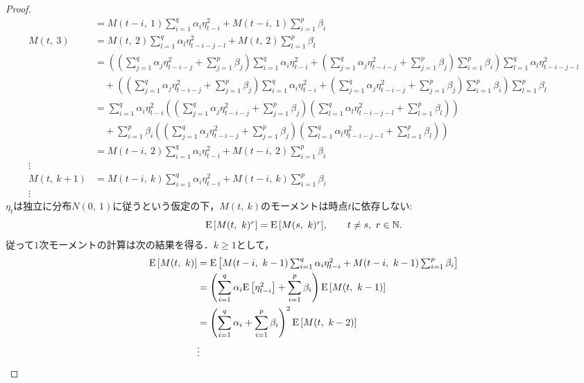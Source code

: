 \documentclass[8pt]{jsarticle}
\newtheorem{proof}{証明}
\def\Exp#1{\mbox{${\rm E} \left[ #1 \right]$}}
\begin{document}
\begin{proof}
\begin{align*}
		&= M(t-i,\ 1) \sum_{i=1}^{q} \alpha_i \eta_{t-i}^2 + M(t-i,\ 1) \sum_{i=1}^{p} \beta_i \\
	M(t,\ 3) &= M(t,\ 2) \sum_{l=1}^{q} \alpha_l \eta_{t-i-j-l}^2 + M(t,\ 2) \sum_{l=1}^{p} \beta_l \\
		&= \left( \left( \sum_{j=1}^{q} \alpha_j \eta_{t-i-j}^2 + \sum_{j=1}^{p} \beta_j \right)\sum_{i=1}^{q} \alpha_i \eta_{t-i}^2 + \left( \sum_{j=1}^{q} \alpha_j \eta_{t-i-j}^2 + \sum_{j=1}^{p} \beta_j \right)\sum_{i=1}^{p} \beta_i \right) \sum_{l=1}^{q} \alpha_l \eta_{t-i-j-l}^2 \\
			&\quad+ \left( \left( \sum_{j=1}^{q} \alpha_j \eta_{t-i-j}^2 + \sum_{j=1}^{p} \beta_j \right)\sum_{i=1}^{q} \alpha_i \eta_{t-i}^2 + \left( \sum_{j=1}^{q} \alpha_j \eta_{t-i-j}^2 + \sum_{j=1}^{p} \beta_j \right)\sum_{i=1}^{p} \beta_i \right) \sum_{l=1}^{p} \beta_l \\
		&= \sum_{i=1}^{q} \alpha_i \eta_{t-i}^2 \left( \left( \sum_{j=1}^{q} \alpha_j \eta_{t-i-j}^2 + \sum_{j=1}^{p} \beta_j \right) \left( \sum_{l=1}^{q} \alpha_l \eta_{t-i-j-l}^2 + \sum_{l=1}^{p} \beta_l \right) \right) \\
			&\quad+ \sum_{i=1}^{p} \beta_i \left( \left( \sum_{j=1}^{q} \alpha_j \eta_{t-i-j}^2 + \sum_{j=1}^{p} \beta_j \right) \left( \sum_{l=1}^{q} \alpha_l \eta_{t-i-j-l}^2 + \sum_{l=1}^{p} \beta_l \right) \right) \\
		&= M(t-i,\ 2) \sum_{i=1}^{q} \alpha_i \eta_{t-i}^2 + M(t-i,\ 2) \sum_{i=1}^{p} \beta_i \\
	\vdots \\
	M(t,\ k+1) &= M(t-i,\ k) \sum_{i=1}^{q} \alpha_i \eta_{t-i}^2 + M(t-i,\ k) \sum_{i=1}^{p} \beta_i \\
	\vdots	
\end{align*}
$\eta_t$は独立に分布$N(0,\ 1)$に従うという仮定の下，$M(t,\ k)$のモーメントは時点$t$に依存しない:
\[
	\Exp{M(t,\ k)^r} = \Exp{M(s,\ k)^r}, \hspace{20pt} t \neq s,\ r \in \mathbb{N}.
\]
従って$1$次モーメントの計算は次の結果を得る．$k \geq 1$として，
\begin{align*}
	\Exp{M(t,\ k)} &= \Exp{ M(t-i,\ k-1) \sum_{i=1}^{q} \alpha_i \eta_{t-i}^2 + M(t-i,\ k-1) \sum_{i=1}^{p} \beta_i } \\
	&= \left( \sum_{i=1}^{q} \alpha_i \Exp{\eta_{t-i}^2} + \sum_{i=1}^{p} \beta_i \right) \Exp{M(t,\ k-1)} \\
	&= \left( \sum_{i=1}^{q} \alpha_i + \sum_{i=1}^{p} \beta_i \right)^2 \Exp{M(t,\ k-2)} \\
	&\vdots \\

\end{align*}
\end{proof}
\end{document}
